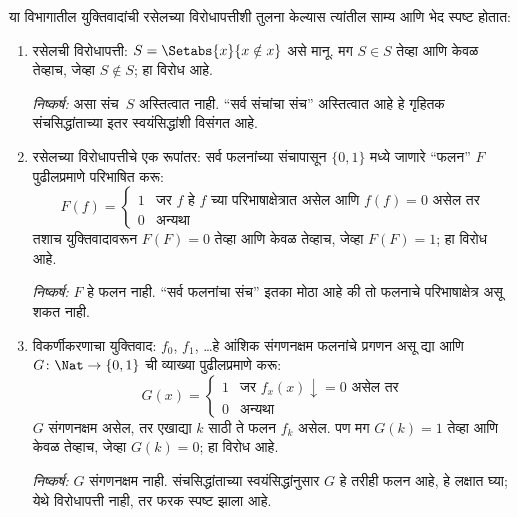 \documentclass[../../../include/open-logic-section]{subfiles}
\begin{document}

या विभागातील युक्तिवादांची रसेलच्या विरोधापत्तीशी तुलना केल्यास
त्यांतील साम्य आणि भेद स्पष्ट होतात:
\begin{enumerate}
\item रसेलची विरोधापत्ती: $S = \Setabs{x}{x \notin x}$ असे मानू.
  मग $S
  \in S$ तेव्हा आणि केवळ तेव्हाच, जेव्हा $S \notin S$; हा विरोध आहे.

  \emph{निष्कर्ष:} असा संच~$S$ अस्तित्वात नाही. ``सर्व संचांचा संच''
  अस्तित्वात आहे हे गृहितक संचसिद्धांताच्या इतर स्वयंसिद्धांशी विसंगत आहे.

\item रसेलच्या विरोधापत्तीचे एक रूपांतर: सर्व फलनांच्या संचापासून
  $\{ 0, 1 \}$ मध्ये जाणारे ``फलन'' $F$ पुढीलप्रमाणे परिभाषित करू:
  \[
  F(f) =
  \begin{cases}
    1 & \text{जर $f$ हे $f$ च्या परिभाषाक्षेत्रात असेल आणि $f(f) = 0$ असेल तर} \\
    0 & \text{अन्यथा}
  \end{cases}
  \]
  तशाच युक्तिवादावरून $F(F) = 0$ तेव्हा आणि केवळ तेव्हाच, जेव्हा
  $F(F) = 1$; हा विरोध आहे.

  \emph{निष्कर्ष:} $F$ हे फलन नाही. ``सर्व फलनांचा संच'' इतका
  मोठा आहे की तो फलनाचे परिभाषाक्षेत्र असू शकत नाही.

\item विकर्णीकरणाचा युक्तिवाद: $f_0$, $f_1$, \dots हे आंशिक
  संगणनक्षम फलनांचे प्रगणन असू द्या आणि $G \colon \Nat \to
  \{ 0, 1 \}$ ची व्याख्या पुढीलप्रमाणे करू:
  \[
  G(x) =
  \begin{cases}
    1 & \text{जर $f_x(x)\downarrow = 0$ असेल तर} \\
    0 & \text{अन्यथा}
  \end{cases}
  \]
  $G$ संगणनक्षम असेल, तर एखाद्या $k$ साठी ते फलन $f_k$
  असेल. पण मग $G(k) = 1$ तेव्हा आणि केवळ तेव्हाच, जेव्हा $G(k) = 0$;
  हा विरोध आहे.

  \emph{निष्कर्ष:} $G$ संगणनक्षम नाही. संचसिद्धांताच्या
  स्वयंसिद्धांनुसार $G$ हे तरीही फलन आहे, हे लक्षात घ्या;
  येथे विरोधापत्ती नाही, तर फरक स्पष्ट झाला आहे.
\end{enumerate}
\end{document}
